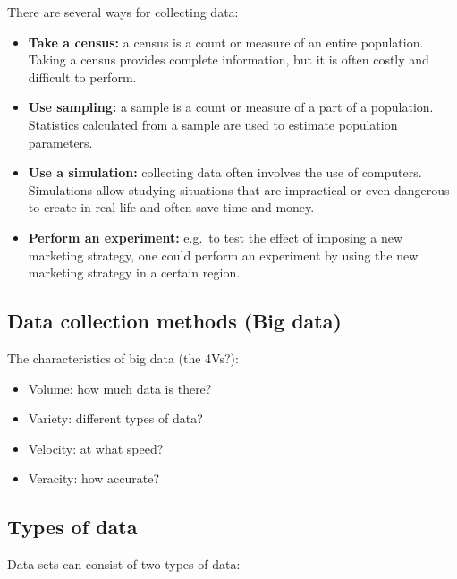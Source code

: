 \documentclass[
]{article}
\providecommand{\tightlist}{%
  \setlength{\itemsep}{0pt}\setlength{\parskip}{0pt}}
\begin{document}
There are several ways for collecting data:

\begin{itemize}
\tightlist
\item
  \textbf{Take a census:} a census is a count or measure of an entire
  population. Taking a census provides complete information, but it is
  often costly and difficult to perform.
\item
  \textbf{Use sampling:} a sample is a count or measure of a part of a
  population. Statistics calculated from a sample are used to estimate
  population parameters.
\item
  \textbf{Use a simulation:} collecting data often involves the use of
  computers. Simulations allow studying situations that are impractical
  or even dangerous to create in real life and often save time and
  money.
\item
  \textbf{Perform an experiment:} e.g.~to test the effect of imposing a
  new marketing strategy, one could perform an experiment by using the
  new marketing strategy in a certain region.
\end{itemize}

\hypertarget{data-collection-methods-big-data}{%
\subsection{Data collection methods (Big
data)}\label{data-collection-methods-big-data}}

The characteristics of big data (the 4Vs?):

\begin{itemize}
\tightlist
\item
  Volume: how much data is there?
\item
  Variety: different types of data?
\item
  Velocity: at what speed?
\item
  Veracity: how accurate?
\end{itemize}

\hypertarget{types-of-data}{%
\subsection{Types of data}\label{types-of-data}}

Data sets can consist of two types of data:
\end{document}

